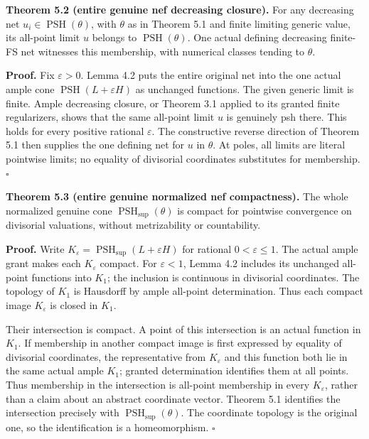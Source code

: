 \documentclass[10pt]{article}
\begin{document}
\textbf{Theorem 5.2 (entire genuine nef decreasing closure).} For any
decreasing net \(u_i\in\operatorname{PSH}(\theta)\), with \(\theta\) as
in Theorem 5.1 and finite limiting generic value, its all-point limit
\(u\) belongs to \(\operatorname{PSH}(\theta)\). One actual defining
decreasing finite-FS net witnesses this membership, with numerical
classes tending to \(\theta\).

\textbf{Proof.} Fix \(\varepsilon>0\). Lemma 4.2 puts the entire
original net into the one actual ample cone
\(\operatorname{PSH}(L+\varepsilon H)\) as unchanged functions. The
given generic limit is finite. Ample decreasing closure, or Theorem 3.1
applied to its granted finite regularizers, shows that the same
all-point limit \(u\) is genuinely psh there. This holds for every
positive rational \(\varepsilon\). The constructive reverse direction of
Theorem 5.1 then supplies the one defining net for \(u\) in \(\theta\).
At poles, all limits are literal pointwise limits; no equality of
divisorial coordinates substitutes for membership. \(\square\)

\textbf{Theorem 5.3 (entire genuine normalized nef compactness).} The
whole normalized genuine cone \(\operatorname{PSH}_{\sup}(\theta)\) is
compact for pointwise convergence on divisorial valuations, without
metrizability or countability.

\textbf{Proof.} Write
\(K_\varepsilon=\operatorname{PSH}_{\sup}(L+\varepsilon H)\) for
rational \(0<\varepsilon\leq1\). The actual ample grant makes each
\(K_\varepsilon\) compact. For \(\varepsilon<1\), Lemma 4.2 includes its
unchanged all-point functions into \(K_1\); the inclusion is continuous
in divisorial coordinates. The topology of \(K_1\) is Hausdorff by ample
all-point determination. Thus each compact image \(K_\varepsilon\) is
closed in \(K_1\).

Their intersection is compact. A point of this intersection is an actual
function in \(K_1\). If membership in another compact image is first
expressed by equality of divisorial coordinates, the representative from
\(K_\varepsilon\) and this function both lie in the same actual ample
\(K_1\); granted determination identifies them at all points. Thus
membership in the intersection is all-point membership in every
\(K_\varepsilon\), rather than a claim about an abstract coordinate
vector. Theorem 5.1 identifies the intersection precisely with
\(\operatorname{PSH}_{\sup}(\theta)\). The coordinate topology is the
original one, so the identification is a homeomorphism. \(\square\)
\end{document}
